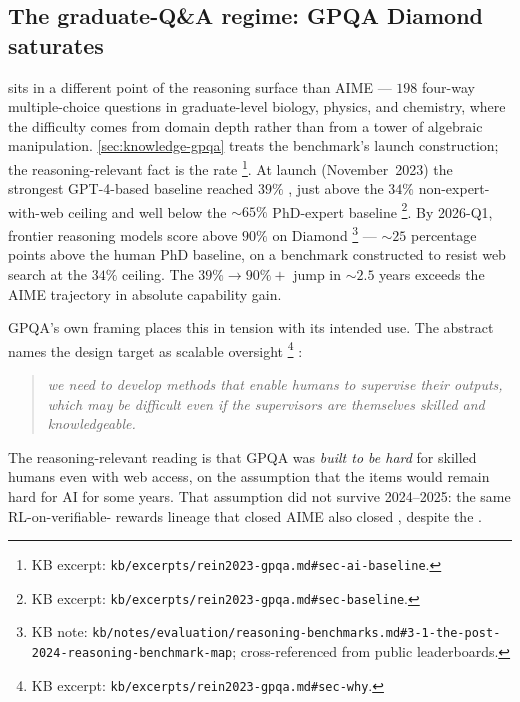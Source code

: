\subsection{The graduate-Q\&A regime: GPQA Diamond saturates}
\label{sec:reasoning-gpqa}

 \citep{rein2023-gpqa} sits in a different point of the
reasoning surface than AIME --- $198$ four-way multiple-choice
questions in graduate-level biology, physics, and chemistry, where
the difficulty comes from domain depth rather than from a tower of
algebraic manipulation. \cref{sec:knowledge-gpqa} treats the
benchmark's launch construction; the reasoning-relevant fact is
the  rate%
\footnote{KB excerpt: \texttt{kb/excerpts/rein2023-gpqa.md\#sec-ai-baseline}.}.
At launch (November~2023) the strongest GPT-4-based baseline
reached $39\%$ \citep[\S{}sec-ai-baseline]{rein2023-gpqa}, just above
the $34\%$ non-expert-with-web ceiling and well below the
$\sim 65\%$ PhD-expert baseline%
\footnote{KB excerpt: \texttt{kb/excerpts/rein2023-gpqa.md\#sec-baseline}.}.
By 2026-Q1, frontier reasoning models score above $90\%$ on Diamond%
\footnote{KB note: \texttt{kb/notes/evaluation/reasoning-benchmarks.md\#3-1-the-post-2024-reasoning-benchmark-map}; cross-referenced from public leaderboards.}
--- $\sim 25$ percentage points above the human PhD baseline, on a
benchmark constructed to resist web search at the $34\%$ ceiling. The
$39\% \to 90\%+$ jump in $\sim 2.5$ years exceeds the AIME
trajectory in absolute capability gain.

GPQA's own framing places this  in tension with its
intended use. The abstract names the design target as scalable
oversight%
\footnote{KB excerpt: \texttt{kb/excerpts/rein2023-gpqa.md\#sec-why}.}
\citep[\S{}sec-why]{rein2023-gpqa}:

\begin{quote}\itshape
we need to develop  methods that enable humans to
supervise their outputs, which may be difficult even if the
supervisors are themselves skilled and knowledgeable.
\end{quote}

The reasoning-relevant reading is that GPQA was \emph{built to be
hard} for skilled humans even with web access, on the assumption
that the items would remain hard for AI for some years. That
assumption did not survive 2024--2025: the same RL-on-verifiable-
rewards lineage that closed AIME also closed , despite
the .

